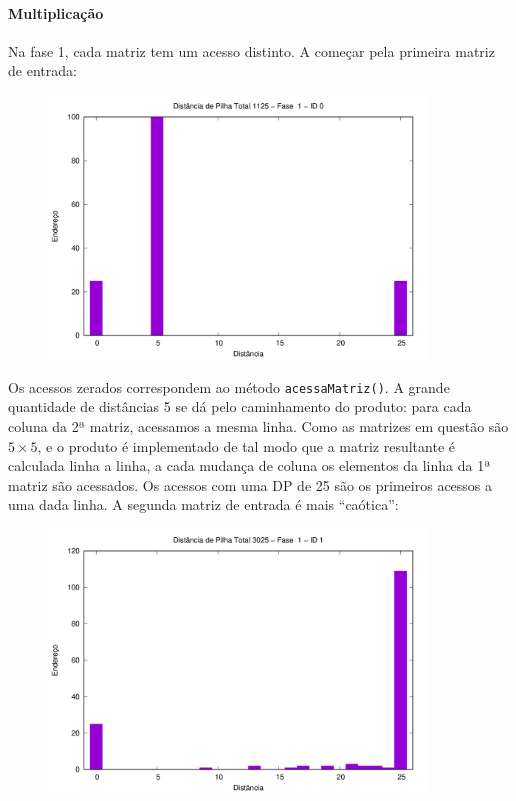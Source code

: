 \documentclass{article}
\def\code#1{\texttt{#1}}
\begin{document}
\paragraph{Multiplicação} Na fase 1, cada matriz tem um acesso distinto. A começar pela primeira matriz de entrada:

\begin{figure} [H]
    \includegraphics[width=10cm]{m-hist-1-0.png} 
    \centering
\end{figure}

Os acessos zerados correspondem ao método \code{acessaMatriz()}. A grande quantidade de distâncias 5 se dá pelo caminhamento do produto: para cada coluna da 2ª matriz, acessamos a mesma linha. Como as matrizes em questão são \( 5 \times 5 \), e o produto é implementado de tal modo que a matriz resultante é calculada linha a linha, a cada mudança de coluna os elementos da linha da 1ª matriz são acessados. Os acessos com uma DP de 25 são os primeiros acessos a uma dada linha. A segunda matriz de entrada é mais ``caótica'':

\begin{figure} [H]
    \includegraphics[width=10cm]{m-hist-1-1.png} 
    \centering
\end{figure}
\end{document}
